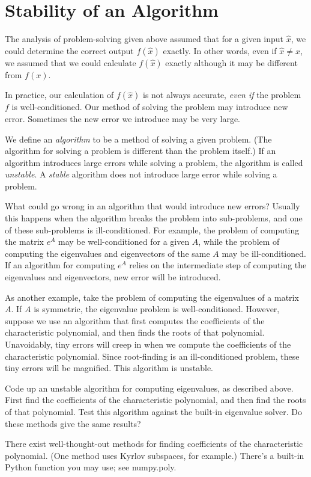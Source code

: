 \section*{Stability of an Algorithm}

The analysis of problem-solving given above assumed that for a given input $\hat{x}$, we could determine the correct output $f(\hat{x})$ exactly. In other words, even if $\hat{x} \neq x$, we assumed that we could calculate $f(\hat{x})$ exactly although it may be different from $f(x)$. 

In practice, our calculation of $f(\hat{x})$ is not always accurate, \emph{even if} the problem $f$ is well-conditioned. Our method of solving the problem may introduce new error. Sometimes the new error we introduce may be very large. 

We define an \emph{algorithm} to be a method of solving a given problem. (The algorithm for solving a problem is different than the problem itself.) If an algorithm introduces large errors while solving a problem, the algorithm is called \emph{unstable}. A \emph{stable} algorithm does not introduce large error while solving a problem.

What could go wrong in an algorithm that would introduce new errors? Usually this happens when the algorithm breaks the problem into sub-problems, and one of these sub-problems is ill-conditioned. For example, the problem of computing the matrix $e^A$ may be well-conditioned for a given $A$, while the problem of computing the eigenvalues and eigenvectors of the same $A$ may be ill-conditioned. If an algorithm for computing $e^A$ relies on the intermediate step of computing the eigenvalues and eigenvectors, new error will be introduced. 

As another example, take the problem of computing the eigenvalues of a matrix $A$. If $A$ is symmetric, the eigenvalue problem is well-conditioned. However, suppose we use an algorithm that first computes the coefficients of the characteristic polynomial, and then finds the roots of that polynomial. Unavoidably, tiny errors will creep in when we compute the coefficients of the characteristic polynomial. Since root-finding is an ill-conditioned problem, these tiny errors will be magnified. This algorithm is unstable.

\begin{problem}
Code up an unstable algorithm for computing eigenvalues, as described above. First find the coefficients of the characteristic polynomial, and then find the roots of that polynomial. Test this algorithm against the built-in eigenvalue solver. Do these methods give the same results?

There exist well-thought-out methods for finding coefficients of the characteristic polynomial. (One method uses Kyrlov subspaces, for example.) There's a built-in Python function you may use; see numpy.poly.
\end{problem}

